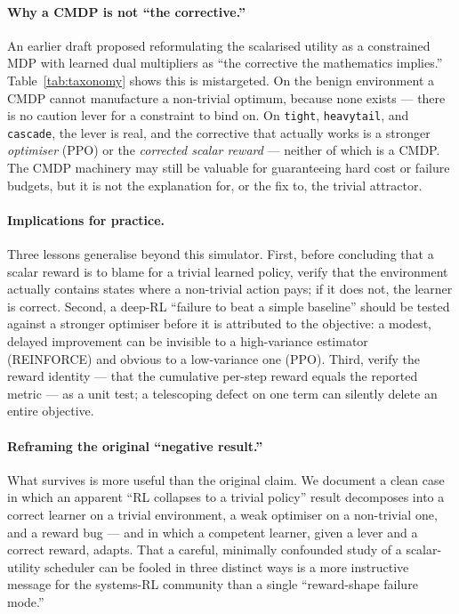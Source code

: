 \documentclass[10pt,twocolumn]{article}
\newcommand{\env}[1]{\texttt{#1}}
\begin{document}
\paragraph{Why a CMDP is not ``the corrective.''} An earlier draft proposed
reformulating the scalarised utility as a constrained MDP with learned dual
multipliers as ``the corrective the mathematics implies.''
Table~\ref{tab:taxonomy} shows this is mistargeted. On the benign environment a
CMDP cannot manufacture a non-trivial optimum, because none exists --- there is no
caution lever for a constraint to bind on. On \env{tight}, \env{heavytail}, and
\env{cascade}, the lever is real, and the corrective that actually works is a
stronger \emph{optimiser} (PPO) or the \emph{corrected scalar reward} --- neither
of which is a CMDP. The CMDP machinery may still be valuable for guaranteeing hard
cost or failure budgets, but it is not the explanation for, or the fix to, the
trivial attractor.

\paragraph{Implications for practice.} Three lessons generalise beyond this
simulator. First, before concluding that a scalar reward is to blame for a trivial
learned policy, verify that the environment actually contains states where a
non-trivial action pays; if it does not, the learner is correct. Second, a
deep-RL ``failure to beat a simple baseline'' should be tested against a stronger
optimiser before it is attributed to the objective: a modest, delayed improvement
can be invisible to a high-variance estimator (REINFORCE) and obvious to a
low-variance one (PPO). Third, verify the reward identity --- that the cumulative
per-step reward equals the reported metric --- as a unit test; a telescoping
defect on one term can silently delete an entire objective.

\paragraph{Reframing the original ``negative result.''} What survives is more
useful than the original claim. We document a clean case in which an apparent
``RL collapses to a trivial policy'' result decomposes into a correct learner on a
trivial environment, a weak optimiser on a non-trivial one, and a reward bug ---
and in which a competent learner, given a lever and a correct reward, adapts. That
a careful, minimally confounded study of a scalar-utility scheduler can be fooled
in three distinct ways is a more instructive message for the systems-RL community
than a single ``reward-shape failure mode.''
\end{document}
